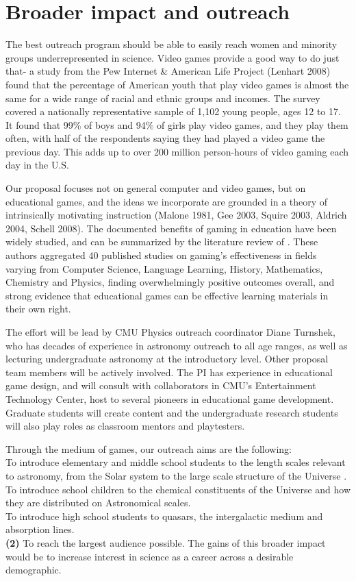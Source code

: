 \section{Broader impact and outreach}

The best outreach program should be able to easily reach women and
minority groups underrepresented in science. Video games provide
a good way to do just that- a  study from the  Pew Internet 
\& American Life 
Project (Lenhart 2008) found that the percentage of American youth
that play video games is almost the same for a wide range of racial and
ethnic groups and incomes. The survey covered a
 nationally representative sample of 1,102 young people, ages 12 to 
17. It found that 99\% of boys and 94\% of girls
play video games, and they play them often, with  half of the respondents 
saying they had played a video game the previous day. This adds up to
over 200 million person-hours of video gaming each day in the U.S.

Our proposal 
focuses not on general computer and video games, but on educational games,
and the ideas we incorporate are 
grounded in a theory of intrinsically motivating instruction 
(Malone 1981, Gee 2003,
Squire 2003, Aldrich 2004, Schell 2008). The documented benefits of gaming
in education have been widely studied, and can be summarized by the 
literature review of \cite{Backlund}. These authors aggregated 40 published
studies on 
gaming's effectiveness in fields varying from Computer Science, 
Language Learning, History, Mathematics, Chemistry and Physics, finding 
overwhelmingly positive outcomes overall, and strong evidence that 
educational games can be effective learning materials in their own right.

The effort will be lead by CMU Physics outreach coordinator Diane 
Turnshek, who has decades of
experience in astronomy outreach to all age ranges, as well
as lecturing undergraduate astronomy at the introductory level.
Other proposal team members will be actively involved. The PI has
experience in educational game design, and will consult with collaborators
in CMU's Entertainment Technology Center, host to several pioneers in 
educational game development. Graduate students will create content
and the undergraduate research students will also play roles
as  classroom mentors and playtesters.




Through the medium of  games, our outreach aims are the following:\\
 To introduce  elementary and middle
school students to the length scales relevant
to astronomy, from the Solar system to the large scale structure of the Universe
.\\
  To introduce school children to the chemical constituents
 of the Universe and how they are distributed on Astronomical scales.\\
 To introduce high school students to 
 quasars, the  intergalactic medium and absorption lines.\\
{\bf (2)}
To reach the largest audience possible. 
 The gains of this broader 
impact would be to increase interest in science as a career across 
a desirable demographic.

